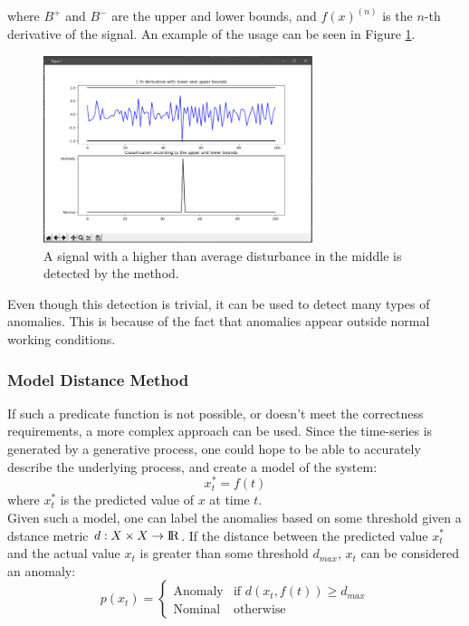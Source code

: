 \documentclass[a4paper, 10pt]{article}
\begin{document}
where $B^+$ and $B^-$ are the upper and lower bounds, and $f(x)^{(n)}$ is the $n$-th derivative of the signal. An example of the usage can be seen in Figure \ref{fig:BDM}.

\begin{figure}
\centering
\includegraphics[width=0.7\textwidth]{BDM}
\caption{A signal with a higher than average disturbance in the middle is detected by the method.}
\label{fig:BDM}
\end{figure}

\FloatBarrier

Even though this detection is trivial, it can be used to detect many types of anomalies. This is because of the fact that anomalies appear outside normal working conditions.

\subsubsection{Model Distance Method}

If such a predicate function is not possible, or doesn't meet the correctness requirements, a more complex approach can be used. Since the time-series is generated by a generative process, one could hope to be able to accurately describe the underlying process, and create a model of the system:
$$x_t^* = f(t)$$
where $x_t^*$ is the predicted value of $x$ at time $t$. \\

Given such a model, one can label the anomalies based on some threshold given a dstance metric $d: X \times X \rightarrow {\rm I\!R}$. If the distance between the predicted value $x_t^*$ and the actual value $x_t$ is greater than some threshold $d_{max}$, $x_t$ can be considered an anomaly:
$$
    p(x_t) =
        \begin{cases}
            \text{Anomaly} & \text{if } d(x_t, f(t)) \ge d_{max} \\
            \text{Nominal} & \text{otherwise}
        \end{cases}
$$
\end{document}
